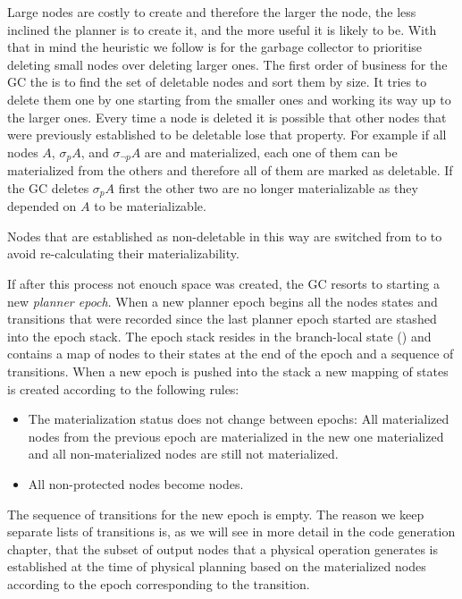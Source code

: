 Large nodes are costly to create and therefore the larger the node,
the less inclined the planner is to create it, and the more useful it
is likely to be. With that in mind the heuristic we follow is for the
garbage collector to prioritise deleting small nodes over deleting
larger ones. The first order of business for the GC the is to find the
set of deletable nodes and sort them by size. It tries to delete them
one by one starting from the smaller ones and working its way up to
the larger ones. Every time a node is deleted it is possible that
other nodes that were previously established to be deletable lose that
property. For example if all nodes \(A\), \(\sigma_p A\), and
\(\sigma_{\neg p} A\) are  and materialized, each one of
them can be materialized from the others and therefore all of them are
marked as deletable. If the GC deletes \(\sigma_p A\) first the other
two are no longer materializable as they depended on \(A\) to be
materializable.

Nodes that are established as non-deletable in this way are switched
from  to  to avoid re-calculating their
materializability.

If after this process not enouch space was created, the GC resorts to
starting a new \emph{planner epoch}. When a new planner epoch begins all
the nodes states and transitions that were recorded since the last
planner epoch started are stashed into the epoch stack. The epoch
stack resides in the branch-local state () and contains a map
of nodes to their states at the end of the epoch and a sequence of
transitions. When a new epoch is pushed into the stack a new mapping
of states is created according to the following rules:

\begin{itemize}
\item The materialization status does not change between epochs: All
  materialized nodes from the previous epoch are materialized in the
  new one materialized and all non-materialized nodes are still not
  materialized.
\item All non-protected  nodes become 
  nodes.
\end{itemize}

The sequence of transitions for the new epoch is empty. The reason we
keep separate lists of transitions is, as we will see in more detail
in the code generation chapter, that the subset of output nodes that a
physical operation generates is established at the time of physical
planning based on the materialized nodes according to the epoch
corresponding to the transition.

